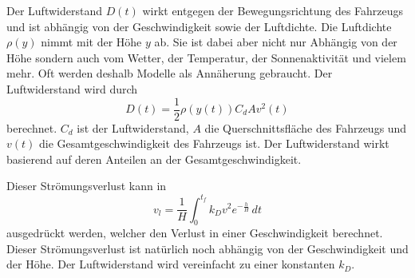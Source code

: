 Der Luftwiderstand $D(t)$ wirkt entgegen der Bewegungsrichtung des Fahrzeugs und ist abhängig von der Geschwindigkeit sowie der Luftdichte. 
Die Luftdichte $\rho(y)$ nimmt mit der Höhe $y$ ab.
Sie ist dabei aber nicht nur Abhängig von der Höhe sondern auch vom Wetter, der Temperatur, der Sonnenaktivität und vielem mehr.
Oft werden deshalb Modelle als Annäherung gebraucht.
Der Luftwiderstand wird durch
\begin{equation}
	D(t) = \frac{1}{2} \rho(y(t)) C_d A v^2(t)
\end{equation}
berechnet.
$C_d$ ist der Luftwiderstand, $A$ die Querschnittsfläche des Fahrzeugs und $v(t)$ die Gesamtgeschwindigkeit des Fahrzeugs ist. 
Der Luftwiderstand wirkt basierend auf deren Anteilen an der Gesamtgeschwindigkeit.

Dieser Strömungsverlust kann in
\begin{equation}
	v_l = \frac{1}{H} \int_0^{t_f} k_Dv^2 e^{-\frac{h}{H}} \, dt
	\label{leo:strömungsverlust}
\end{equation}
ausgedrückt werden, welcher den Verlust in einer Geschwindigkeit berechnet.
Dieser Strömungsverlust ist natürlich noch abhängig von der Geschwindigkeit und der Höhe.
Der Luftwiderstand wird vereinfacht zu einer konstanten $k_D$. 


